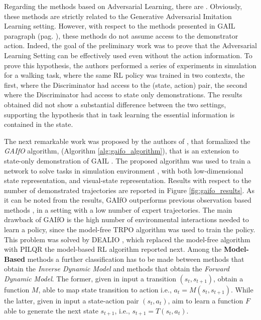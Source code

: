 \newline Regarding the methods based on Adversarial Learning, there are \cite{merel2017learning,torabi2018gaifo}. Obviously, these methods are strictly related to the Generative Adversarial Imitation Learning setting. However, with respect to the methods presented in GAIL paragraph (pag. \pageref{para:gail}), these methods do not assume access to the demonstrator action. Indeed, the goal of the preliminary work \cite{merel2017learning} was to prove that the Adversarial Learning Setting can be effectively used even without the action information. To prove this hypothesis, the authors performed a series of experiments in simulation for a walking task, where the same RL policy was trained in two contexts, the first, where the Discriminator had access to the (state, action) pair, the second where the Discriminator had access to state only demonstrations. The results obtained did not show a substantial difference between the two settings, supporting the hypothesis that in task learning the essential information is contained in the state.

\newline The next remarkable work was proposed by the authors of \cite{torabi2018gaifo}, that formalized the \textit{GAIfO} algorithm, (Algorithm \ref{alg:gaifo_algorithm}), that is an extension to state-only demonstration of GAIL \cite{ho2016gail}. The proposed algorithm was used to train a network to solve tasks in simulation environment \cite{brockman2016openai}, with both low-dimensional state representation, and visual-state representation. Results with respect to the number of demonstrated trajectories are reported in Figure \ref{fig:gaifo_results}.
As it can be noted from the results, GAIfO outperforms previous observation based methods \cite{sermanet2018time_contrastive,torabi2018bco}, in a setting with a low number of expert trajectories. The main drawback of GAIfO is the high number of environmental interactions needed to learn a policy, since the model-free TRPO \cite{schulman2015trpo} algorithm was used to train the policy. This problem was solved by DEALIO \cite{torabi2021dealio}, which replaced the model-free algorithm with PILQR \cite{chebotar2017pilqr} the model-based RL algorithm reported next. 
\noindent Among the \textbf{Model-Based} methods a further classification has to be made between methods that obtain the \textit{Inverse Dynamic Model} and methods that obtain the \textit{Forward Dynamic Model}. The former, given in input a transition $(s_{t}, s_{t+1})$, obtain a function $M$, able to map state transition to action i.e., $a_{t} = M(s_{t}, s_{t+1})$. While the latter, given in input a state-action pair $(s_{t}, a_{t})$, aim to learn a function $F$ able to generate the next state $s_{t+1}$, i.e., $s_{t+1} = T(s_{t}, a_{t})$.
